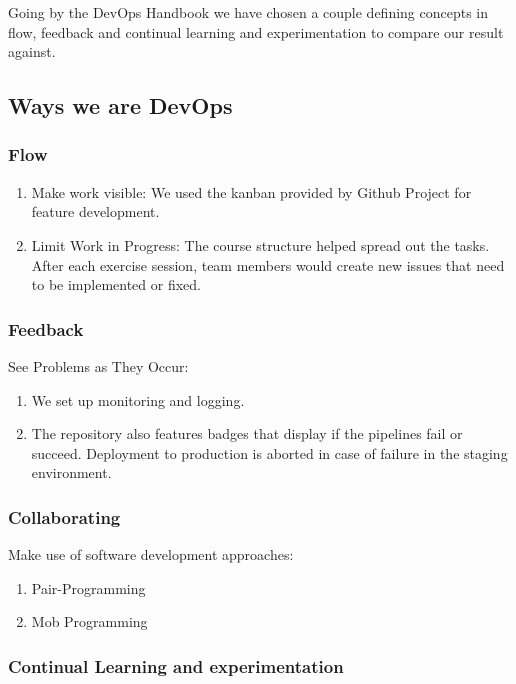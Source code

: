 \documentclass{article}
\begin{document}
Going by the DevOps Handbook \cite{devopshandbook} we have chosen a couple defining concepts in flow, feedback and continual learning and experimentation to compare our result against. 

\subsection{Ways we are DevOps}

\subsubsection{Flow}

\begin{enumerate}
    \item Make work visible: We used the kanban provided by Github Project for feature development. 
    \item Limit Work in Progress: The course structure helped spread out the tasks. After each exercise session, team members would create new issues that need to be implemented or fixed.
\end{enumerate}

\subsubsection{Feedback}

See Problems as They Occur: 

\begin{enumerate}
    \item We set up monitoring and logging.
    \item The repository also features badges that display if the pipelines fail or succeed. Deployment to production is aborted in case of failure in the staging environment.
\end{enumerate}

\subsubsection{Collaborating}

Make use of software development approaches:

\begin{enumerate}
    \item Pair-Programming
    \item Mob Programming
\end{enumerate}

\subsubsection{Continual Learning and experimentation}
\end{document}
